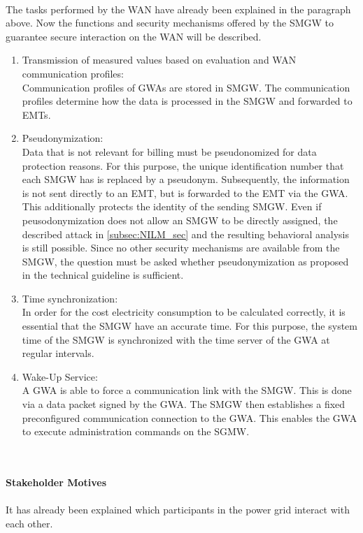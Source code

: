 \\
The tasks performed by the WAN have already been explained in the paragraph above. Now the functions and security mechanisms offered by the SMGW to guarantee secure interaction on the WAN will be described.
\begin{enumerate}
\item Transmission of measured values based on evaluation and WAN communication profiles:\\
Communication profiles of GWAs are stored in SMGW. The communication profiles determine how the data is processed in the SMGW and forwarded to EMTs.

\item Pseudonymization:\\
Data that is not relevant for billing must be pseudonomized for data protection reasons. For this purpose, the unique identification number that each SMGW has is replaced by a pseudonym. Subsequently, the information is not sent directly to an EMT, but is forwarded to the EMT via the GWA. This additionally protects the identity of the sending SMGW.%
Even if peusodonymization does not allow an SMGW to be directly assigned, the described attack in \ref{subsec:NILM_sec} and the resulting behavioral analysis is still possible. Since no other security mechanisms are available from the SMGW, the question must be asked whether pseudonymization as proposed in the technical guideline is sufficient.

\item Time synchronization:\\
In order for the cost electricity consumption to be calculated correctly, it is essential that the SMGW have an accurate time. For this purpose, the system time of the SMGW is synchronized with the time server of the GWA at regular intervals.

\item Wake-Up Service:\\
A GWA is able to force a communication link with the SMGW. This is done via a data packet signed by the GWA. The SMGW then establishes a fixed preconfigured communication connection to the GWA. This enables the GWA to execute administration commands on the SGMW. 
\end{enumerate}
\\
\\
\textbf{Stakeholder Motives}
\\
\\
It has already been explained which participants in the power grid interact with each other. %
